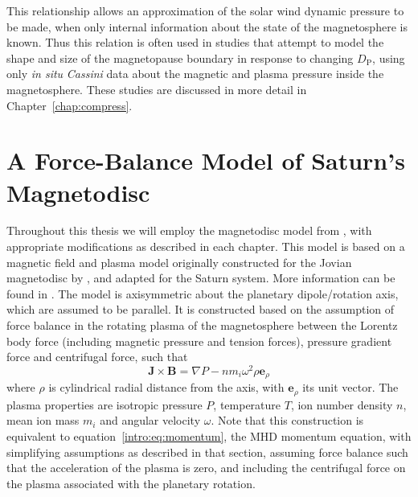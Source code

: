 This relationship allows an approximation of the solar wind dynamic pressure to be made, when only internal information about the state of the magnetosphere is known. 
Thus this relation is often used in studies that attempt to model the shape and size of the magnetopause boundary in response to changing $D_\mathrm{P}$, using only \textit{in situ} \textit{Cassini} data about the magnetic and plasma pressure inside the magnetosphere. These studies are discussed in more detail in Chapter~\ref{chap:compress}.

\section{A Force-Balance Model of Saturn's Magnetodisc}\label{intro:sec:forcebalancemodel}
Throughout this thesis we will employ the magnetodisc model from \citet{achilleos2010a}, with appropriate modifications as described in each chapter. This model is based on a magnetic field and plasma model originally constructed for the Jovian magnetodisc by \citet{caudal1986}, and adapted for the Saturn system. More information can be found in \citet{achilleos2010a, achilleos2010b}. The model is axisymmetric about the planetary dipole/rotation axis, which are assumed to be parallel. It is constructed based on the assumption of force balance in the rotating plasma of the magnetosphere between the Lorentz body force (including magnetic pressure and tension forces), pressure gradient force and centrifugal force, such that 
\begin{equation}\label{intro:eq:forcebalance}
\boldsymbol{J} \times \boldsymbol{B} = \nabla P - nm_i\omega^2\rho\boldsymbol{e}_\rho
\end{equation}
where $\rho$ is cylindrical radial distance from the axis, with $\boldsymbol{e}_\rho$ its unit vector. The plasma properties are isotropic pressure $P$, temperature $T$, ion number density $n$, mean ion mass $m_i$ and angular velocity $\omega$. Note that this construction is equivalent to equation~\ref{intro:eq:momentum}, the MHD momentum equation, with simplifying assumptions as described in that section, assuming force balance such that the acceleration of the plasma is zero, and including the centrifugal force on the plasma associated with the planetary rotation.

